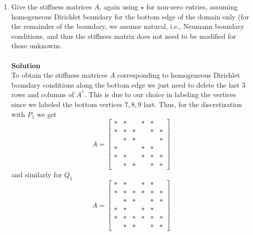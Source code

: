 \documentclass[11pt]{article}
\begin{document}
\begin{enumerate}
\begin{enumerate}
{\bf Solution}\\
The global stiffness matrix is sparser for the triangular discretization simply because there is less overlap between the basis functions.  For instance, the basis function corresponding to the middle vertex will have support that overlaps with all basis functions in the case of quadrilateral elements.  We can also see visually from the matrices $A^*$ that triangular discretization gives a more sparse stiffness matrix.  Moreover, since the triangular discretization is finer with more elements we expect this discretization to give more accurate results.  This is because we can resolve the true function on a finer scale.\\
\\


  \item Give the stiffness matrices $A$, again using $\star$ for
    non-zero entries, assuming homogeneous Dirichlet boundary for the
    bottom edge of the domain only (for the remainder of the boundary,
    we assume natural, i.e., Neumann boundary conditions, and thus the
    stiffness matrix does not need to be modified for those unknowns.\\
\\

{\bf Solution}\\
To obtain the stiffness matrices $A$ corresponding to homogeneous Dirichlet boundary conditions along the bottom edge we just need to delete the last 3 rows and columns of $A^*$.  This is due to our choice in labeling the vertices since we labeled the bottom vertices $7,8,9$ last.  Thus, for the discretization with $P_1$ we get
\[
A = \begin{bmatrix}
* & * &   & * & * &    \\
* & * & * &   & * & *   \\
  & * & * &   &   & *    \\
* &   &   & * & * &      \\
* & * &   & * & * & *\\
  & * & * &   & * & * 
\end{bmatrix}
\]
and similarly for $Q_1$
\[
A = \begin{bmatrix}
* & * &   & * & * &      \\
* & * & * & * & * & *    \\
  & * & * &   & * & *   \\
* & * &   & * & * &      \\
* & * & * & * & * & *  \\
  & * & * &   & * & * 
\end{bmatrix}
\]


\end{enumerate}
\end{enumerate}
\end{document}
